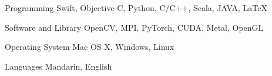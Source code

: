 


\begin{cvskills}


\cvskill
{Programming} %
{Swift, Objective-C, Python, C/C++, Scala, JAVA, LaTeX} %


\cvskill
{Software and Library} %
{OpenCV, MPI, PyTorch, CUDA, Metal, OpenGL} %

\cvskill
{Operating System}
{Mac OS X, Windows, Linux}

\cvskill
{Languages} %
{Mandarin, English} %


\end{cvskills}